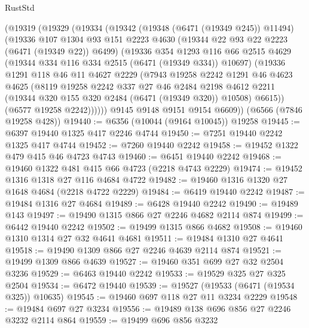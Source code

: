 \begin{lexlean}{RustStd}
\begin{coremodule}
    (@19319
      (@19329
        (@19334
          (@19342
            (@19348 (@6471 (@19349 @245)) @11494)
            (@19336
              @107
              @1304
              @93
              @151
              @2223
              @4630
              (@19344 @22 @93 @22 @2223 (@6471 (@19349 @22)) @6499)
              (@19336
                @354
                @1293
                @116
                @66
                @2515
                @4629
                (@19344 @334 @116 @334 @2515 (@6471 (@19349 @334)) @10697)
                (@19336
                  @1291
                  @118
                  @46
                  @11
                  @4627
                  @2229
                  (@7943
                    @19258
                    @2242
                    @1291
                    @46
                    @4623
                    @4625
                    (@8119
                      @19258
                      @2242
                      @337
                      @27
                      @46
                      @2484
                      @2198
                      @4612
                      @2211
                      (@19344 @320 @155 @320 @2484 (@6471 (@19349 @320)) @10508)
                      @6615))
                  (@6577 @19258 @2242))))))
        @9145
        @9148
        @9151
        @9154
        @6609))
    (@6566 (@7846 @19258 @428))
@19440 := @6356 (@10044 (@9164 @10045)) @19258
@19445 := @6397 @19440 @1325 @417 @2246 @4744
@19450 := @7251 @19440 @2242 @1325 @417 @4744
@19452 := @7260 @19440 @2242
@19458 := @19452 @1322 @479 @415 @46 @4723 @4743
@19460 := @6451 @19440 @2242
@19468 := @19460 @1322 @481 @415 @66 @4723 (@2218 @4743 @2229)
@19474 := @19452 @1316 @1318 @27 @116 @4684 @4722
@19482 := @19460 @1316 @1320 @27 @1648 @4684 (@2218 @4722 @2229)
@19484 := @6419 @19440 @2242
@19487 := @19484 @1316 @27 @4684
@19489 := @6428 @19440 @2242
@19490 := @19489 @143
@19497 := @19490 @1315 @866 @27 @2246 @4682 @2114 @874
@19499 := @6442 @19440 @2242
@19502 := @19499 @1315 @866 @4682
@19508 := @19460 @1310 @1314 @27 @32 @4641 @4681
@19511 := @19484 @1310 @27 @4641
@19518 := @19490 @1309 @866 @27 @2246 @4639 @2114 @874
@19521 := @19499 @1309 @866 @4639
@19527 := @19460 @351 @699 @27 @32 @2504 @3236
@19529 := @6463 @19440 @2242
@19533 := @19529 @325 @27 @325 @2504
@19534 := @6472 @19440
@19539 := @19527 (@19533 (@6471 (@19534 @325)) @10635)
@19545 := @19460 @697 @118 @27 @11 @3234 @2229
@19548 := @19484 @697 @27 @3234
@19556 := @19489 @138 @696 @856 @27 @2246 @3232 @2114 @864
@19559 := @19499 @696 @856 @3232

\end{coremodule}
\end{lexlean}
